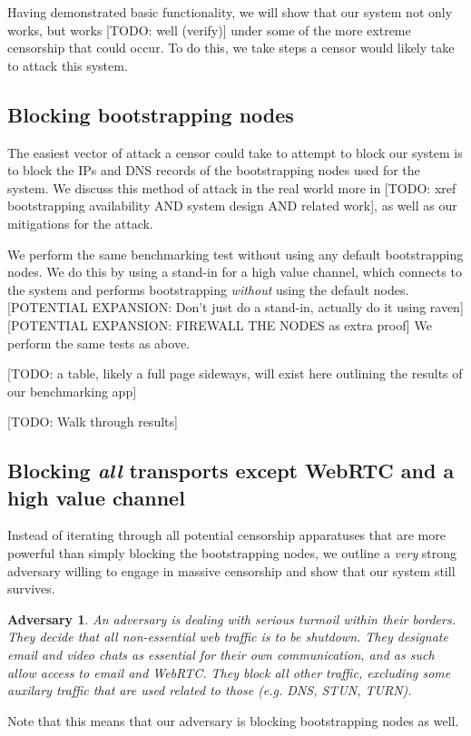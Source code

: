 \documentclass[12pt]{report}
\newtheorem*{adversary}{Adversary}
\begin{document}
Having demonstrated basic functionality, we will show that our system not only works, but works [TODO: well (verify)] under some of the more extreme censorship that could occur. To do this, we take steps a censor would likely take to attack this system.

\subsection{Blocking bootstrapping nodes}

The easiest vector of attack a censor could take to attempt to block our system is to block the IPs and DNS records of the bootstrapping nodes used for the system. We discuss this method of attack in the real world more in [TODO: xref bootstrapping availability AND system design AND related work], as well as our mitigations for the attack.

We perform the same benchmarking test without using any default bootstrapping nodes. We do this by using a stand-in for a high value channel, which connects to the system and performs bootstrapping \emph{without} using the default nodes. [POTENTIAL EXPANSION: Don't just do a stand-in, actually do it using raven] [POTENTIAL EXPANSION: FIREWALL THE NODES as extra proof] We perform the same tests as above.

[TODO: a table, likely a full page sideways, will exist here outlining the results of our benchmarking app]

[TODO: Walk through results]

\subsection{Blocking \emph{all} transports except WebRTC and a high value channel}

Instead of iterating through all potential censorship apparatuses that are more powerful than simply blocking the bootstrapping nodes, we outline a \emph{very} strong adversary willing to engage in massive censorship and show that our system still survives.
\begin{adversary}
An adversary is dealing with serious turmoil within their borders. They decide that all non-essential web traffic is to be shutdown. They designate email and video chats as essential for their own communication, and as such allow access to email and WebRTC. They block all other traffic, excluding some auxilary traffic that are used related to those (e.g. DNS, STUN, TURN).
\end{adversary}
Note that this means that our adversary is blocking bootstrapping nodes as well.
\end{document}
